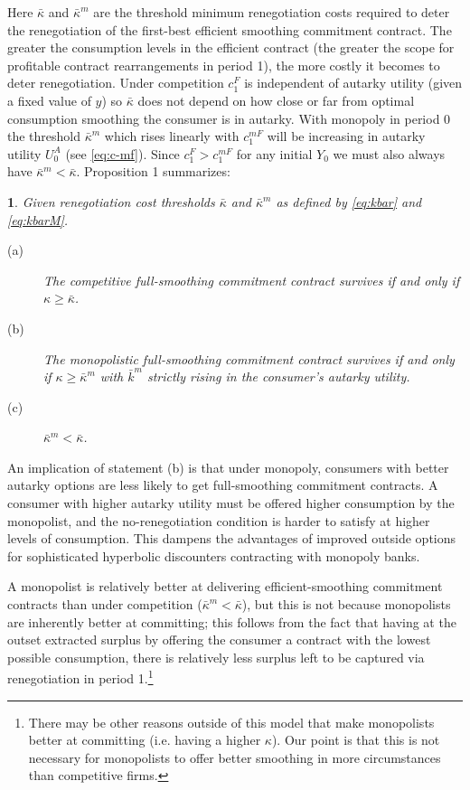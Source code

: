 \documentclass[11pt,english]{article}
\theoremstyle{plain}
\newtheorem{prop}{\protect\propositionname}
\theoremstyle{definition}
\providecommand{\propositionname}{Proposition}
\begin{document}
Here $\bar{\kappa}$ and $\bar{\kappa}^{m}$ are the threshold minimum
renegotiation costs required to deter the renegotiation of the first-best
efficient smoothing commitment contract. The greater the consumption
levels in the efficient contract (the greater the scope for profitable
contract rearrangements in period 1), the more costly it becomes to
deter renegotiation.
Under competition $c_{1}^{F}$ is independent of autarky utility (given
a fixed value of $y$) so $\bar{\kappa}$ does not depend on how close
or far from optimal consumption smoothing the consumer is in autarky.
With monopoly in period 0 the threshold $\bar{\kappa}^{m}$ which
rises linearly with $c_{1}^{mF}$ will be increasing in autarky utility
$U_{0}^{A}$ (see \ref{eq:c-mf}). Since $c_{1}^{F}>c_{1}^{mF}$ for
any initial $Y_{0}$ we must also always have $\bar{\kappa}^{m}<\bar{\kappa}$.
Proposition 1 summarizes: 
\begin{prop}
\label{Prop:full-commit} Given renegotiation cost thresholds  $\bar{\kappa}$
and $\bar{\kappa}^{m}$ as defined by \ref{eq:kbar} and
\ref{eq:kbarM}. 
\begin{description}
\item [{(a)}] The competitive full-smoothing commitment contract survives
if and only if $\kappa\geq$$\bar{\kappa}$. 
\item [{(b)}] The monopolistic full-smoothing commitment contract survives
if and only if $\kappa\geq$$\bar{\kappa}^{m}$ with $\bar{k}^{m}$
strictly rising in the consumer's autarky utility. 
\item [{(c)}] $\bar{\kappa}^{m}<\bar{\kappa}$. 
\end{description}
\end{prop}
An implication of statement (b)  is that under
monopoly, consumers with better autarky options are less likely to
get full-smoothing commitment contracts. A
consumer with higher autarky utility must be offered higher consumption
by the monopolist, and the no-renegotiation condition is harder to
satisfy at higher levels of consumption. This  dampens the
advantages of improved outside options for sophisticated hyperbolic
discounters contracting with monopoly banks.

A monopolist is relatively better at delivering efficient-smoothing
commitment contracts than under competition ($\bar{\kappa}^{m}<\bar{\kappa}$),
but this is not because monopolists are inherently better at committing;
this follows from the fact that having at the outset extracted
surplus by offering the consumer a contract with the lowest possible
consumption, there is relatively less surplus left to be captured
via renegotiation in period 1.\footnote{There may be other reasons outside of this model that make monopolists
better at committing (i.e. having a higher $\kappa$). Our point is
that this is not necessary for monopolists to offer better smoothing
in more circumstances than competitive firms.}
\end{document}
